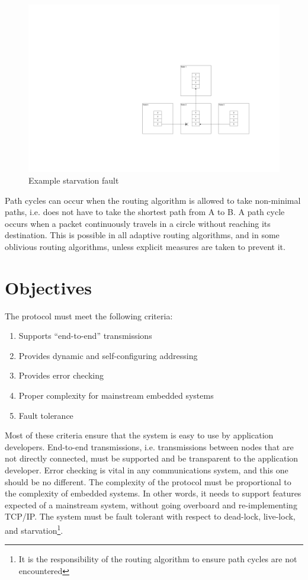 \begin{figure}[ptb]
	\begin{centering}
		\includegraphics[scale=0.75]{Protocol/Figures/protocol-starvation.pdf}
		\caption{Example starvation fault}
		\label{fig:protocol:starvation}
	\end{centering}
\end{figure}

Path cycles can occur when the routing algorithm is allowed to take non-minimal paths, i.e. does not have to take the shortest path from A to B. A path cycle occurs when a packet continuously travels in a circle without reaching its destination. This is possible in all adaptive routing algorithms, and in some oblivious routing algorithms, unless explicit measures are taken to prevent it.

\section{Objectives}\label{sec:protocol:objectives}

The protocol must meet the following criteria: 
\begin{enumerate}
	\item Supports ``end-to-end'' transmissions
	\item Provides dynamic and self-configuring addressing
	\item Provides error checking
	\item Proper complexity for mainstream embedded systems
	\item Fault tolerance
\end{enumerate}
Most of these criteria ensure that the system is easy to use by application developers. End-to-end transmissions, i.e. transmissions between nodes that are not directly connected, must be supported and be transparent to the application developer. Error checking is vital in any communications system, and this one should be no different. The complexity of the protocol must be proportional to the complexity of embedded systems. In other words, it needs to support features expected of a mainstream system, without going overboard and re-implementing TCP/IP. The system must be fault tolerant with respect to dead-lock, live-lock, and starvation\footnote{It is the responsibility of the routing algorithm to ensure path cycles are not encountered}.

